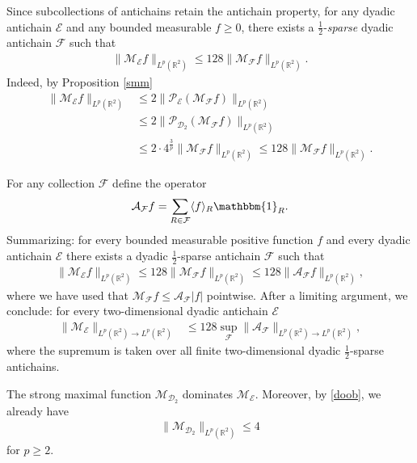 \documentclass[oneside]{amsart}
\theoremstyle{definition}
\theoremstyle{plain}
\numberwithin{equation}{section}
\numberwithin{theorem}{section}
\newcommand{\ind}{\mathbbm{1}}
\begin{document}
Since subcollections of antichains retain the antichain property,
for any dyadic antichain $\mathcal{E}$ and any bounded measurable
$f \geq 0$, there exists a $\frac{1}{2}$-\emph{sparse} dyadic antichain
$\mathcal{F}$ such that
\begin{align*}
  \|\mathcal{M}_{\mathcal{E}}f\|_{L^p(\mathbb{R}^2)} \leq
  128\|\mathcal{M}_{\mathcal{F}} f\|_{L^p(\mathbb{R}^2)}.
\end{align*}
Indeed, by Proposition \ref{smm}
\begin{align*}
  \|\mathcal{M}_{\mathcal{E}}f\|_{L^p(\mathbb{R}^2)} &\leq
  2\|\mathcal{P}_{\mathcal{E}}(
    \mathcal{M}_{\mathcal{F}} f)\|_{L^p(\mathbb{R}^2)} \\
  &\leq 2\|\mathcal{P}_{\mathcal{D}_2}(
    \mathcal{M}_{\mathcal{F}} f)\|_{L^p(\mathbb{R}^2)} \\
  &\leq 2 \cdot 4^{\frac{3}{p}}
    \|\mathcal{M}_{\mathcal{F}}f\|_{L^p(\mathbb{R}^2)}
  \leq 128 \|\mathcal{M}_{\mathcal{F}}f\|_{L^p(\mathbb{R}^2)}.
\end{align*}

For any collection $\mathcal{F}$ define the operator
\begin{align*}
  \mathcal{A}_{\mathcal{F}} f = \sum_{R \in \mathcal{F}} \langle f \rangle_R
  \ind_R.
\end{align*}
Summarizing: for every bounded measurable positive function $f$ and every dyadic
antichain $\mathcal{E}$ there exists a dyadic $\frac{1}{2}$-sparse antichain
$\mathcal{F}$ such that
\begin{align*}
  \|\mathcal{M}_{\mathcal{E}}f\|_{L^p(\mathbb{R}^2)}
  \leq 128 \|\mathcal{M}_{\mathcal{F}} f\|_{L^p(\mathbb{R}^2)}
  \leq 128 \|\mathcal{A}_{\mathcal{F}} f\|_{L^p(\mathbb{R}^2)},
\end{align*}
where we have used that
$\mathcal{M}_{\mathcal{F}}f \leq \mathcal{A}_{\mathcal{F}}|f|$ pointwise.
After a limiting argument, we conclude: for every two-dimensional dyadic
antichain $\mathcal{E}$
\begin{align*}
  \|\mathcal{M}_{\mathcal{E}}\|_{L^p(\mathbb{R}^2) \to L^p(\mathbb{R}^2)}
  &\leq 128\sup_{\mathcal{F}}
    \|\mathcal{A}_{\mathcal{F}}\|_{L^p(\mathbb{R}^2) \to L^p(\mathbb{R}^2)},
\end{align*}
where the supremum is taken over all finite two-dimensional dyadic
$\frac{1}{2}$-sparse antichains.

The strong maximal function $\mathcal{M}_{\mathcal{D}_2}$ dominates
$\mathcal{M}_{\mathcal{E}}$. Moreover, by \eqref{doob}, we already have
\begin{align*}
  \|\mathcal{M}_{\mathcal{D}_2}\|_{L^p(\mathbb{R}^2)} \leq 4
\end{align*}
for $p \geq 2$.
\end{document}
